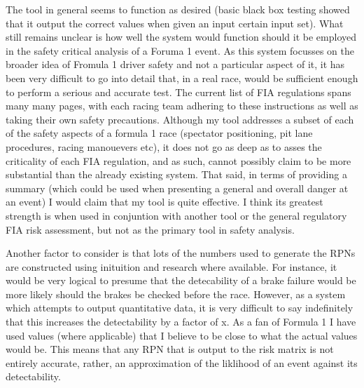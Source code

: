 \documentclass[12pt]{article} %
\begin{document}
The tool in general seems to function as desired (basic black box testing showed that it output the correct values when given an input certain input set). What still remains unclear is how well the system would function should it be employed in the safety critical analysis of a Foruma 1 event. As this system focusses on the broader idea of Fromula 1 driver safety and not a particular aspect of it, it has been very difficult to go into detail that, in a real race, would be sufficient enough to perform a serious and accurate test. The current list of FIA regulations spans many many pages, with each racing team adhering to these instructions as well as taking their own safety precautions. Although my tool addresses a subset of each of the safety aspects of a formula 1 race (spectator positioning, pit lane procedures, racing manouevers etc), it does not go as deep as to asses the criticality of each FIA regulation, and as such, cannot possibly claim to be more substantial than the already existing system. That said, in terms of providing a summary (which could be used when presenting a general and overall danger at an event) I would claim that my tool is quite effective. I think its greatest strength is when used in conjuntion with another tool or the general regulatory FIA risk assessment, but not as the primary tool in safety analysis.

Another factor to consider is that lots of the numbers used to generate the RPNs are constructed using inituition and research where available. For instance, it would be very logical to presume that the detecability of a brake failure would be more likely should the brakes be checked before the race. However, as a system which attempts to output quantitative data, it is very difficult to say indefinitely that this increases the detectability by a factor of x. As a fan of Formula 1 I have used values (where applicable) that I believe to be close to what the actual values would be. This means that any RPN that is output to the risk matrix is not entirely accurate, rather, an approximation of the liklihood of an event against its detectability.



\end{document}
